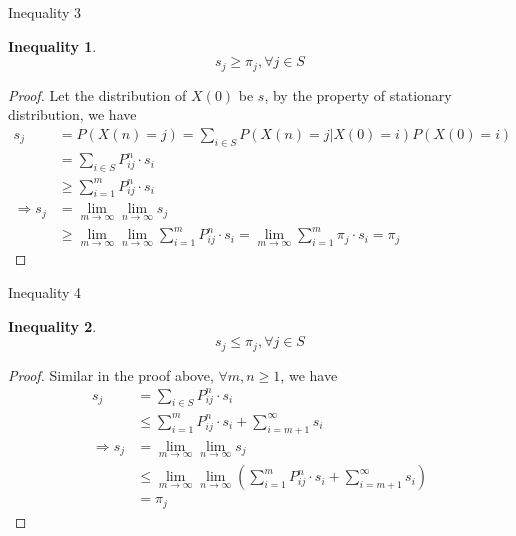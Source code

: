 \documentclass{beamer}
\newtheorem{ineq}{Inequality}
\begin{document}
\begin{frame}{Inequality 3}
	\begin{ineq}
		\[
		s_j \geq \pi_j, \forall j \in S
		\]
	\end{ineq}
\end{frame}

\begin{frame}
	\begin{proof}
		Let the distribution of $X(0)$ be $s$, by the property of stationary distribution, we have
		\begin{align*}
			             s_j &= P(X(n)=j) = \sum_{i \in S} P(X(n) = j | X(0) = i)P(X(0) = i) \\
			                 &= \sum_{i \in S} P^n_{ij} \cdot s_i \\
			                 &\geq \sum_{i=1}^m P^n_{ij} \cdot s_i \\
			\Rightarrow  s_j &= \lim_{m \to \infty}\lim_{n \to \infty} s_j \\
			                 &\geq \lim_{m \to \infty}\lim_{n \to \infty} \sum_{i=1}^m P^n_{ij} \cdot s_i
			                  = \lim_{m \to \infty}\sum_{i=1}^m \pi_j \cdot s_i = \pi_j
		\end{align*}
	\end{proof}
\end{frame}

\begin{frame}{Inequality 4}
	\begin{ineq}
		\[
		s_j \leq \pi_j, \forall j \in S
		\]
	\end{ineq}
\end{frame}

\begin{frame}
	\begin{proof}
		Similar in the proof above, $\forall m,n \geq 1$, we have
		\begin{align*}
			            s_j &= \sum_{i \in S} P^n_{ij} \cdot s_i \\
			                &\leq \sum_{i=1}^m P^n_{ij} \cdot s_i + \sum_{i=m+1}^\infty s_i \\
			\Rightarrow s_j &= \lim_{m \to \infty}\lim_{n \to \infty} s_j \\
			                &\leq \lim_{m \to \infty}\lim_{n \to \infty} \left( 
			                	\sum_{i=1}^m P^n_{ij} \cdot s_i + \sum_{i=m+1}^\infty s_i \right) \\
			                &= \pi_j
		\end{align*}
	\end{proof}
\end{frame}
\end{document}
